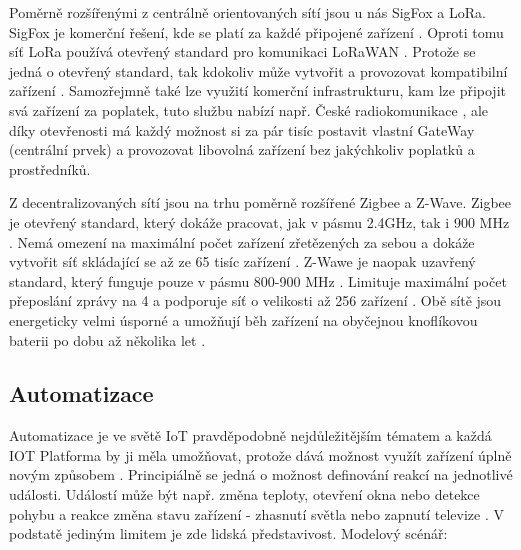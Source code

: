 Poměrně rozšířenými z centrálně orientovaných sítí jsou u nás SigFox a LoRa. SigFox je komerční řešení, kde se platí za každé připojené zařízení \cite{sigfox-price}. Oproti tomu síť LoRa používá otevřený standard pro komunikaci LoRaWAN \cite{lora}. Protože se jedná o otevřený standard, tak kdokoliv může vytvořit a provozovat kompatibilní zařízení \cite{lora}. Samozřejmně také lze využití komerční infrastrukturu, kam lze připojit svá zařízení za poplatek, tuto službu nabízí např. České radiokomunikace \cite{cra}, ale díky otevřenosti má každý možnost si za pár tisíc postavit vlastní GateWay (centrální prvek) a provozovat libovolná zařízení bez jakýchkoliv poplatků a prostředníků.

Z decentralizovaných sítí jsou na trhu poměrně rozšířené Zigbee a Z-Wave. Zigbee je otevřený standard, který dokáže pracovat, jak v pásmu 2.4GHz, tak i 900 MHz \cite{zigbee}. Nemá omezení na maximální počet zařízení zřetězených za sebou a dokáže vytvořit síť skládající se až ze 65 tisíc zařízení \cite{zigbee}. Z-Wawe je naopak uzavřený standard, který funguje pouze v pásmu 800-900 MHz \cite{zwawe}. Limituje maximální počet přeposlání zprávy na 4 a podporuje síť o velikosti až 256 zařízení \cite{zwawe}. Obě sítě jsou energeticky velmi úsporné a umožňují běh zařízení na obyčejnou knoflíkovou baterii po dobu až několika let \cite{zigbee, zwawe}.

\subsection{Automatizace}
Automatizace je ve světě IoT pravděpodobně nejdůležitějším tématem a každá IOT Platforma by ji měla umožňovat, protože dává možnost využít zařízení úplně novým způsobem \cite{what-future-hold}. Principiálně se jedná o možnost definování reakcí na jednotlivé události. Událostí může být např. změna teploty, otevření okna nebo detekce pohybu a reakce změna stavu zařízení - zhasnutí světla nebo zapnutí televize \cite{what-future-hold}. V podstatě jediným limitem je zde lidská představivost. Modelový scénář:

